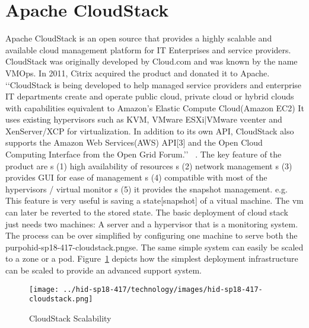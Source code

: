 
\section{Apache CloudStack}

Apache CloudStack is an open source that provides a highly scalable
and available cloud management platform for IT Enterprises and service
providers. CloudStack was originally developed by Cloud.com and was
known by the name VMOps.  In 2011, Citrix acquired the product and
donated it to Apache.
‘‘CloudStack is being developed to help managed service providers and
enterprise IT departments create and operate public cloud, private
cloud or hybrid clouds with capabilities equivalent to Amazon's
Elastic Compute Cloud(Amazon EC2) It uses existing hypervisors such
as KVM, VMware ESXi|VMware vcenter and XenServer/XCP for
virtualization. In addition to its own API, CloudStack also supports
the Amazon Web Services(AWS) API[3] and the Open Cloud Computing
Interface from the Open Grid Forum.’’ ~\cite{
  hid-sp18-417-wiki-cloudStack}.
The key feature of the product are 
s (1) high availability of resources
s (2) network management
s (3) provides GUI for ease of management
s (4) compatible with most of the hypervisors / virtual monitor
s (5) it provides the snapshot management. e.g. This feature is 
very useful is saving a state[snapshot] of a vitual machine. 
The vm can later be reverted to the stored state.  
The basic deployment of cloud stack just needs two machines: 
 A server and a hypervisor that is a monitoring system.  The process
can be over simplified by configuring one machine to serve both the
purpohid-sp18-417-cloudstack.pngse.
The same simple system can easily be scaled to a zone or a pod.
Figure~\ref{F:cloudstack-scalabuility} depicts how the simplest
deployment infrastructure can be scaled to provide an advanced support
system.
\begin{figure}[htb]
  \texttt{[image: ../hid-sp18-417/technology/images/hid-sp18-417-cloudstack.png]}
  \caption{CloudStack Scalability~\cite{hid-sp18-417-cloudstack-scaling}}
  \label{F:cloudstack-scalabuility}
\end{figure}
